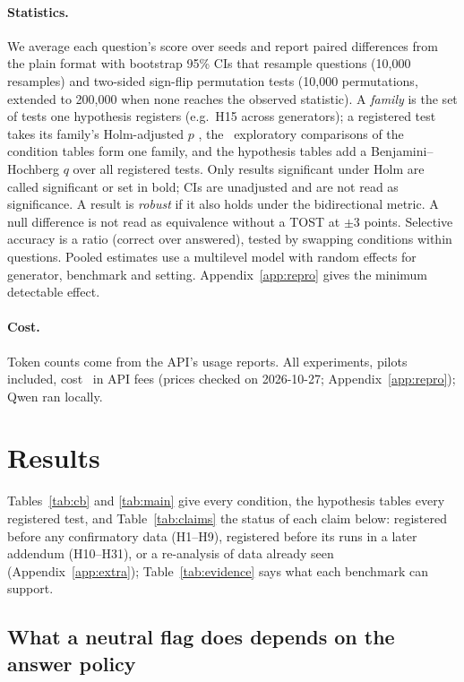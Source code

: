 \paragraph{Statistics.}
We average each question's score over seeds and report paired differences from the plain format with
bootstrap 95\% CIs that resample questions (10,000 resamples) and two-sided sign-flip permutation tests
\citep{efron1993bootstrap,dror2018hitchhiker} (10,000 permutations, extended to 200,000 when none reaches the observed
statistic). A \emph{family} is the set of tests one hypothesis registers (e.g.\ H15 across generators); a registered
test takes its family's Holm-adjusted $p$ \citep{holm1979simple}, the \nExploratory\ exploratory comparisons of the
condition tables form one family, and the hypothesis tables add a Benjamini--Hochberg $q$ over all registered tests.
Only results significant under Holm are called significant or set in bold; CIs are unadjusted and are not read as
significance. A result is \emph{robust} if it also holds under the bidirectional metric. A null difference is not read
as equivalence without a TOST \citep{lakens2017equivalence} at $\pm$3 points. Selective accuracy is a ratio (correct
over answered), tested by swapping conditions within questions. Pooled estimates use a multilevel model with random
effects for generator, benchmark and setting. Appendix~\ref{app:repro} gives the minimum detectable effect.

\paragraph{Cost.}
Token counts come from the API's usage reports. All experiments, pilots included, cost \totalSpend\ in API fees
(prices checked on 2026-10-27; Appendix~\ref{app:repro}); Qwen ran locally.
\section{Results}
\label{sec:results}

Tables~\ref{tab:cb} and \ref{tab:main} give every condition, the hypothesis tables every registered test, and
Table~\ref{tab:claims} the status of each claim below: registered before any confirmatory data (H1--H9), registered before its
runs in a later addendum (H10--H31), or a re-analysis of data already seen (Appendix~\ref{app:extra});
Table~\ref{tab:evidence} says what each benchmark can support.

\subsection{What a neutral flag does depends on the answer policy}
\label{sec:neutral}


